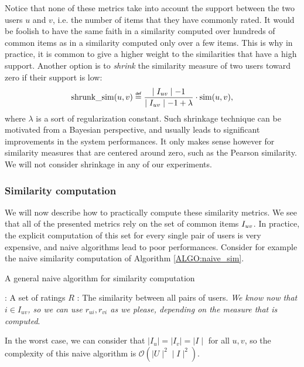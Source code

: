 Notice that none of these metrics take into account the support between the two
users $u$ and $v$, i.e. the number of items that they have commonly rated. It
would be foolish to have the same faith in a similarity computed over hundreds
of common items as in a similarity computed only over a few items. This is why
in practice, it is common to give a higher weight to the similarities that have
a high support. Another option is to \textit{shrink} the similarity measure of
two users toward zero if their support is low:
$$\text{shrunk\_sim}(u, v) \eqdef \frac{\mid \Iuv \mid - 1}{\mid \Iuv \mid - 1
+ \lambda} \cdot \ssim(u, v),$$
where $\lambda$ is a sort of regularization constant. Such shrinkage technique
can be motivated from a Bayesian perspective, and usually leads to significant
improvements in the system performances. It only makes sense however for
similarity measures that are centered around zero, such as the Pearson
similarity. We will not consider shrinkage in any of our experiments.

\subsubsection{Similarity computation}

We will now describe how to practically compute these similarity metrics. We
see that all of the presented metrics rely on the set of common items $I_{uv}$.
In practice, the explicit computation of this set for every single pair of
users is very expensive, and naive algorithms lead to poor performances.
Consider for example the naive similarity computation of Algorithm
\ref{ALGO:naive_sim}.
\begin{algorithm}[!ht]
 \caption{A general naive algorithm for similarity computation}
       \label{ALGO:naive_sim}
       \begin{algorithmic}

         : A set of ratings $R$
         : The similarity between all pairs of users.
         \STATE \textit{We know now that $i \in I_{uv}$, so we can use $r_{ui},
         r_{vi}$ as we please, depending on the measure that is computed}.
         \ENDIF
        \ENDFOR
        \ENDFOR
        \ENDFOR
\end{algorithmic}
\end{algorithm}
In the worst case, we can consider that $\mid I_u \mid = \mid I_v \mid = \mid I
\mid$ for all $u, v$, so the complexity of this naive algorithm is
$\mathcal{O}(\mid U \mid^2 \mid I \mid^2)$.

